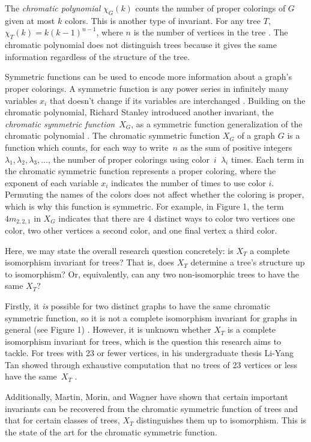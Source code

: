\documentclass[a4paper,12pt]{article}
\begin{document}
\begin{spacing}{1}
The \emph{chromatic polynomial} $\chi_G(k)$ counts the number of proper colorings of $G$ given at most $k$ colors. This is another type of invariant. For any tree $T$, $\chi_T(k) = k(k - 1)^{n - 1}$, where $n$ is the number of vertices in the tree \cite{bollobasgraphs}. The chromatic polynomial does not distinguish trees because it gives the same information regardless of the structure of the tree.

Symmetric functions can be used to encode more information about a graph's proper colorings. A symmetric function is any power series in infinitely many variables $x_i$ that doesn't change if its variables are interchanged \cite{enumerative}. Building on the chromatic polynomial, Richard Stanley introduced another invariant, the \emph{chromatic symmetric function}~$X_G$, as a symmetric function generalization of the chromatic polynomial \cite{csfstanley}. The chromatic symmetric function $X_G$ of a graph $G$ is a function which counts, for each way to write~$n$ as the sum of positive integers $\lambda_1, \lambda_2, \lambda_3, \ldots$, the number of proper colorings using color~$i$~$\lambda_i$ times. Each term in the chromatic symmetric function represents a proper coloring, where the exponent of each variable $x_i$ indicates the number of times to use color $i$. Permuting the names of the colors does not affect whether the coloring is proper, which is why this function is symmetric. For example, in Figure 1, the term $4m_{2,2,1}$ in $X_G$ indicates that there are 4 distinct ways to color two vertices one color, two other vertices a second color, and one final vertex a third color.

Here, we may state the overall research question concretely: is $X_T$ a complete isomorphism invariant for trees? That is, does $X_T$ determine a tree's structure up to isomorphism? Or, equivalently, can any two non-isomorphic trees to have the same $X_T$?

Firstly, it \emph{is} possible for two distinct graphs to have the same chromatic symmetric function, so it is not a complete isomorphism invariant for graphs in general (see Figure 1) \cite{csfstanley}. However, it is unknown whether $X_T$ is a complete isomorphism invariant for trees, which is the question this research aims to tackle. For trees with 23 or fewer vertices, in his undergraduate thesis Li-Yang Tan showed through exhaustive computation that no trees of 23 vertices or less have the same~$X_T$ \cite{tantrees}.

Additionally, Martin, Morin, and Wagner \cite{distinguishtrees} have shown that certain important invariants can be recovered from the chromatic symmetric function of trees and that for certain classes of trees, $X_T$ distinguishes them up to isomorphism. This is the state of the art for the chromatic symmetric function.


\end{spacing}
\end{document}

